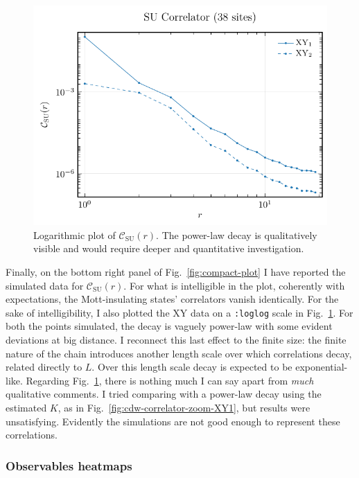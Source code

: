 \begin{figure}[htbp!]
	\centering
	\includegraphics[width=0.6\linewidth]{../Project/analysis/states-properties/su-correlator_L=38.pdf}
	\caption{Logarithmic plot of $\mathcal{C}_\mathrm{SU}(r)$. The power-law decay is qualitatively visible and would require deeper and quantitative investigation.}
	\label{fig:su-correlator-loglog}
\end{figure}

Finally, on the bottom right panel of Fig.~\ref{fig:compact-plot} I have reported the simulated data for $\mathcal{C}_\mathrm{SU}(r)$. For what is intelligible in the plot, coherently with expectations, the Mott-insulating states' correlators vanish identically. For the sake of intelligibility, I also plotted the $\mathrm{XY}$ data on a \texttt{:loglog} scale in Fig.~\ref{fig:su-correlator-loglog}. For both the points simulated, the decay is vaguely power-law with some evident deviations at big distance. I reconnect this last effect to the finite size: the finite nature of the chain introduces another length scale over which correlations decay, related directly to $L$. Over this length scale decay is expected to be exponential-like. Regarding Fig.~\ref{fig:su-correlator-loglog}, there is nothing much I can say apart from \textit{much} qualitative comments. I tried comparing with a power-law decay using the estimated $K$, as in Fig.~\ref{fig:cdw-correlator-zoom-XY1}, but results were unsatisfying. Evidently the simulations are not good enough to represent these correlations.

\subsubsection{Observables heatmaps}

